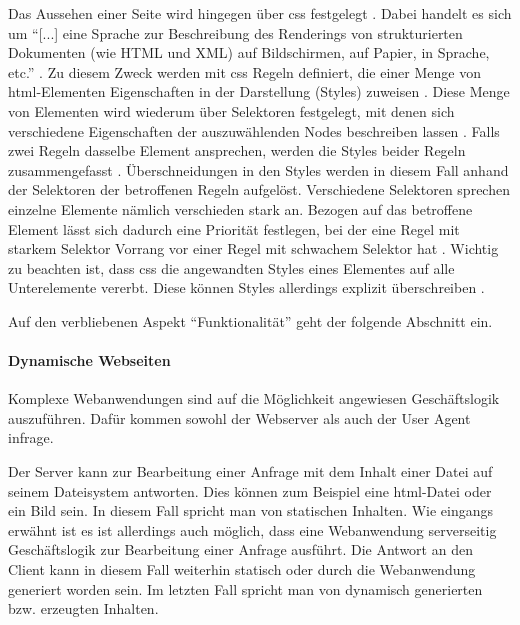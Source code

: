         Das Aussehen einer Seite wird hingegen über \gls{css} festgelegt \cite{w3c:css}.
        Dabei handelt es sich um "`[...] eine Sprache zur Beschreibung des Renderings
        von strukturierten Dokumenten (wie HTML und XML) auf Bildschirmen, auf Papier,
        in Sprache, etc."' \cite{w3c:css}.
        Zu diesem Zweck werden mit \gls{css} Regeln definiert,
        die einer Menge von \gls{html}-Elementen Eigenschaften in der Darstellung (Styles) zuweisen
        \cite{w3c:cssSyntax}.
        Diese Menge von Elementen wird wiederum über Selektoren festgelegt,
        mit denen sich verschiedene Eigenschaften der auszuwählenden Nodes beschreiben lassen
        \cite{w3c:cssSelectors}.
        Falls zwei Regeln dasselbe Element ansprechen,
        werden die Styles beider Regeln zusammengefasst
        \cite{w3c:cssCascading}.
        Überschneidungen in den Styles werden in diesem Fall anhand der Selektoren der betroffenen Regeln aufgelöst.
        Verschiedene Selektoren sprechen einzelne Elemente nämlich verschieden stark an.
        Bezogen auf das betroffene Element lässt sich dadurch eine Priorität festlegen,
        bei der eine Regel mit starkem Selektor Vorrang vor einer Regel mit schwachem Selektor hat
        \cite{w3c:cssSelectors}. 
        Wichtig zu beachten ist, dass \gls{css} die angewandten Styles eines Elementes auf alle Unterelemente vererbt.
        Diese können Styles allerdings explizit überschreiben
        \cite{w3c:cssCascading}.
        
        Auf den verbliebenen Aspekt "`Funktionalität"' geht der folgende Abschnitt ein.

        \paragraph*{Dynamische Webseiten}
        Komplexe Webanwendungen sind auf die Möglichkeit angewiesen Geschäftslogik auszuführen.
        Dafür kommen sowohl der Webserver als auch der User Agent infrage.

        Der Server kann zur Bearbeitung einer Anfrage mit dem Inhalt einer Datei auf seinem Dateisystem antworten.
        Dies können zum Beispiel eine \gls{html}-Datei oder ein Bild sein.
        In diesem Fall spricht man von statischen Inhalten.
        Wie eingangs erwähnt ist es ist allerdings auch möglich,
        dass eine Webanwendung serverseitig Geschäftslogik zur Bearbeitung einer Anfrage ausführt.
        Die Antwort an den Client kann in diesem Fall weiterhin statisch oder
        durch die Webanwendung generiert worden sein.
        Im letzten Fall spricht man von dynamisch generierten bzw. erzeugten Inhalten.

